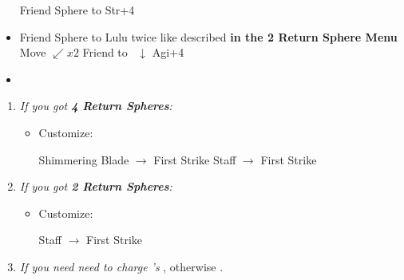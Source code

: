 \begin{spheregrid}
    \begin{itemize}
        \yunaf Friend Sphere to \tidus
        \yunaf Str+4
        \item Friend Sphere to Lulu twice like described \textbf{in the 2 Return Sphere Menu}
        \kimahrif Move $\swarrow x2$
        \yunaf Friend to \kimahri\ $\downarrow$
        \yunaf Agi+4
        \item {}
    \end{itemize}
\end{spheregrid}
\begin{enumerate}[resume]
    \item \textit{If you got \textbf{4 Return Spheres}:}
    \begin{itemize}
        \item Customize:
        \begin{itemize}
            \auronf Shimmering Blade $\rightarrow$ First Strike
            \yunaf Staff $\rightarrow$ First Strike
        \end{itemize}
    \end{itemize}
    \item \textit{If you got \textbf{2 Return Spheres}:}
    \begin{itemize}
        \item Customize:
        \begin{itemize}
            \yunaf Staff $\rightarrow$ First Strike
        \end{itemize}
    \end{itemize}
    \bothvfill
    \winvfill
    \lossvfill
    \item \textit{If you need need to charge \rikku's \od} \formation{\tidus}{\rikku}{\auron}, otherwise \formation{\tidus}{\kimahri}{\wakka}.
\end{enumerate}

